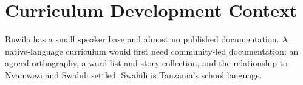 \documentclass[12pt]{article}
\begin{document}
\section{Curriculum Development Context}
Ruwila has a small speaker base and almost no published documentation. A native-language curriculum would first need community-led documentation: an agreed orthography, a word list and story collection, and the relationship to Nyamwezi and Swahili settled. Swahili is Tanzania's school language.
\end{document}
